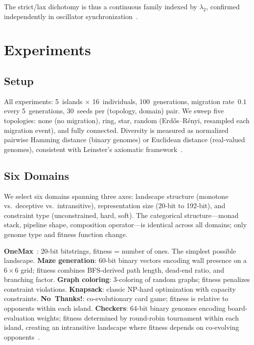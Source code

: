 \documentclass[submission,copyright,creativecommons]{eptcs}
\begin{document}
The strict/lax dichotomy is thus a continuous family indexed by
$\lambda_2$, confirmed independently in oscillator
synchronization~\cite{sanz2026algebraic}.

\section{Experiments}
\label{sec:experiments}

\subsection{Setup}

All experiments: 5~islands $\times$ 16~individuals, 100~generations,
migration rate~$0.1$ every 5~generations, 30~seeds per
(topology, domain) pair. We sweep five topologies: none (no migration),
ring, star, random (Erd\H{o}s--R\'{e}nyi, resampled each migration
event), and fully connected. Diversity is measured as normalized
pairwise Hamming distance (binary genomes) or Euclidean distance
(real-valued genomes), consistent with Leinster's axiomatic
framework~\cite{leinster2021entropy}.

\subsection{Six Domains}

We select six domains spanning three axes: landscape structure
(monotone vs.\ deceptive vs.\ intransitive), representation size
(20-bit to 192-bit), and constraint type (unconstrained, hard, soft).
The categorical structure---monad stack, pipeline shape, composition
operator---is identical across all domains; only genome type and
fitness function change.

\textbf{OneMax}~\cite{mitchell1992royal}: 20-bit bitstrings, fitness = number
of ones. The simplest possible landscape.
\textbf{Maze generation}: 60-bit binary vectors encoding wall
presence on a $6 \times 6$ grid; fitness combines BFS-derived path
length, dead-end ratio, and branching factor.
\textbf{Graph coloring}: 3-coloring of random graphs; fitness penalizes
constraint violations.
\textbf{Knapsack}: classic NP-hard optimization with capacity
constraints.
\textbf{No~Thanks!}: co-evolutionary card game; fitness is relative
to opponents within each island.
\textbf{Checkers}: 64-bit binary genomes encoding board-evaluation
weights; fitness determined by round-robin tournament within each
island, creating an intransitive landscape where fitness depends on
co-evolving opponents~\cite{samuel1959checkers}.
\end{document}
